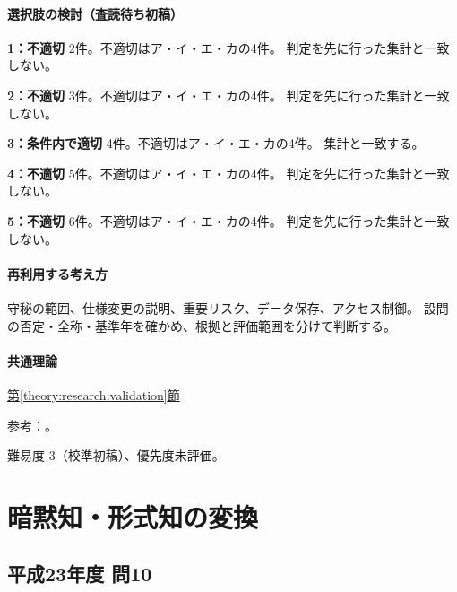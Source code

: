 \paragraph{選択肢の検討（査読待ち初稿）}\mbox{}\par

\noindent\textbf{1：不適切} 2件。不適切はア・イ・エ・カの4件。 判定を先に行った集計と一致しない。\par

\noindent\textbf{2：不適切} 3件。不適切はア・イ・エ・カの4件。 判定を先に行った集計と一致しない。\par

\noindent\textbf{3：条件内で適切} 4件。不適切はア・イ・エ・カの4件。 集計と一致する。\par

\noindent\textbf{4：不適切} 5件。不適切はア・イ・エ・カの4件。 判定を先に行った集計と一致しない。\par

\noindent\textbf{5：不適切} 6件。不適切はア・イ・エ・カの4件。 判定を先に行った集計と一致しない。\par

\paragraph{再利用する考え方} 守秘の範囲、仕様変更の説明、重要リスク、データ保存、アクセス制御。 設問の否定・全称・基準年を確かめ、根拠と評価範囲を分けて判断する。

\paragraph{共通理論} \hyperref[theory:research:validation]{第\ref*{theory:research:validation}節}

\par 参考：\cite{ipej_ethics2011,scj_code2013}。

\par 難易度 3（校準初稿）、優先度未評価。

\section{暗黙知・形式知の変換}

\subsection{平成23年度 問10}
\label{q:h23-reg-apt-10}

